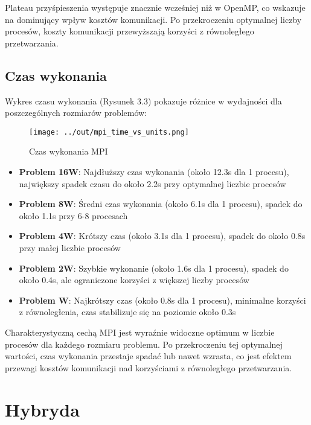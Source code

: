 \documentclass[12pt,a4paper]{report}
\begin{document}
Plateau przyśpieszenia występuje znacznie wcześniej niż w OpenMP, co wskazuje na dominujący wpływ kosztów komunikacji. Po przekroczeniu optymalnej liczby procesów, koszty komunikacji przewyższają korzyści z równoległego przetwarzania.

\section{Czas wykonania}
Wykres czasu wykonania (Rysunek 3.3) pokazuje różnice w wydajności dla poszczególnych rozmiarów problemów:
\begin{figure}[h]
    \centering
    \texttt{[image: ../out/mpi\_time\_vs\_units.png]}
    \caption{Czas wykonania MPI}
    \label{fig:mpi_time}
\end{figure}
\begin{itemize}
    \item \textbf{Problem 16W}: Najdłuższy czas wykonania (około 12.3s dla 1 procesu), największy spadek czasu do około 2.2s przy optymalnej liczbie procesów
    \item \textbf{Problem 8W}: Średni czas wykonania (około 6.1s dla 1 procesu), spadek do około 1.1s przy 6-8 procesach
    \item \textbf{Problem 4W}: Krótszy czas (około 3.1s dla 1 procesu), spadek do około 0.8s przy małej liczbie procesów
    \item \textbf{Problem 2W}: Szybkie wykonanie (około 1.6s dla 1 procesu), spadek do około 0.4s, ale ograniczone korzyści z większej liczby procesów
    \item \textbf{Problem W}: Najkrótszy czas (około 0.8s dla 1 procesu), minimalne korzyści z równoległenia, czas stabilizuje się na poziomie około 0.3s
\end{itemize}

Charakterystyczną cechą MPI jest wyraźnie widoczne optimum w liczbie procesów dla każdego rozmiaru problemu. Po przekroczeniu tej optymalnej wartości, czas wykonania przestaje spadać lub nawet wzrasta, co jest efektem przewagi kosztów komunikacji nad korzyściami z równoległego przetwarzania.

\chapter{Hybryda}
\end{document}
